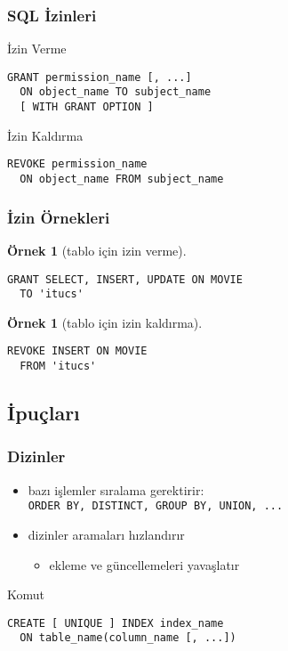 \documentclass[dvipsnames]{beamer}
\theoremstyle{definition}
\theoremstyle{example}
\newtheorem{ornek}[theorem]{Örnek}
\theoremstyle{plain}
\begin{document}
\begin{frame}[fragile]
  \frametitle{SQL İzinleri}

  \begin{block}{İzin Verme}
    \begin{lstlisting}
GRANT permission_name [, ...]
  ON object_name TO subject_name
  [ WITH GRANT OPTION ]
    \end{lstlisting}
  \end{block}

  \pause
  \begin{block}{İzin Kaldırma}
    \begin{lstlisting}
REVOKE permission_name
  ON object_name FROM subject_name
    \end{lstlisting}
  \end{block}
\end{frame}

\begin{frame}[fragile]
  \frametitle{İzin Örnekleri}

  \begin{ornek}[tablo için izin verme]
    \begin{lstlisting}
GRANT SELECT, INSERT, UPDATE ON MOVIE
  TO 'itucs'
    \end{lstlisting}
  \end{ornek}

  \pause
  \begin{ornek}[tablo için izin kaldırma]
    \begin{lstlisting}
REVOKE INSERT ON MOVIE
  FROM 'itucs'
    \end{lstlisting}
  \end{ornek}
\end{frame}

\subsection{İpuçları}

\begin{frame}[fragile]
  \frametitle{Dizinler}

  \begin{itemize}
    \item bazı işlemler sıralama gerektirir:\\
      \lstinline!ORDER BY, DISTINCT, GROUP BY, UNION, ...!

    \pause
    \item dizinler aramaları hızlandırır
    \begin{itemize}
      \item ekleme ve güncellemeleri yavaşlatır
    \end{itemize}
  \end{itemize}

  \pause
  \begin{block}{Komut}
    \begin{lstlisting}
CREATE [ UNIQUE ] INDEX index_name
  ON table_name(column_name [, ...])
    \end{lstlisting}
  \end{block}
\end{frame}
\end{document}
